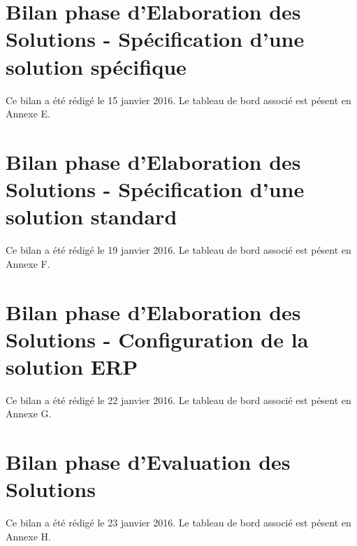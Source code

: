 \setcounter{section}{0}


\part{Bilan phase d'Elaboration des Solutions - Spécification d'une solution spécifique}

Ce bilan a été rédigé le 15 janvier 2016. Le tableau de bord associé est pésent en Annexe E.

\setcounter{section}{0}


\part{Bilan phase d'Elaboration des Solutions - Spécification d'une solution standard}

Ce bilan a été rédigé le 19 janvier 2016. Le tableau de bord associé est pésent en Annexe F.

\setcounter{section}{0}


\part{Bilan phase d'Elaboration des Solutions - Configuration de la solution ERP}

Ce bilan a été rédigé le 22 janvier 2016. Le tableau de bord associé est pésent en Annexe G.

\setcounter{section}{0}


\part{Bilan phase d'Evaluation des Solutions}

Ce bilan a été rédigé le 23 janvier 2016. Le tableau de bord associé est pésent en Annexe H.

\setcounter{section}{0}


